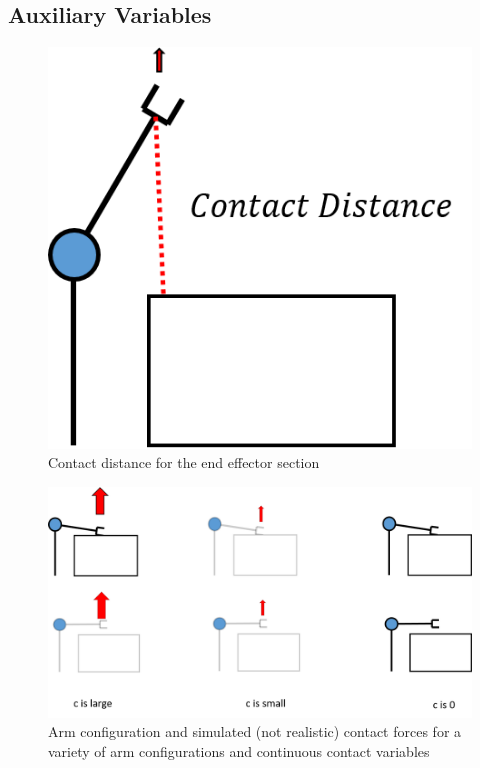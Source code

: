 \documentclass[../thesis.tex]{subfiles}
\begin{document}








\subsection{Auxiliary Variables}
\begin{figure}
  \centering
  \includegraphics[width=.3\linewidth]{./Planning/contact_distance.png}
  \caption{Contact distance for the end effector section}
  \label{fig:contact_distance}
\end{figure}

\begin{figure}
  \centering
  \includegraphics[width=.7\linewidth]{./Planning/ContactArms.png}
  \caption{Arm configuration and simulated (not realistic) contact forces for a variety of arm configurations and continuous contact variables}
  \label{fig:ContactArms}
\end{figure}
\end{document}

